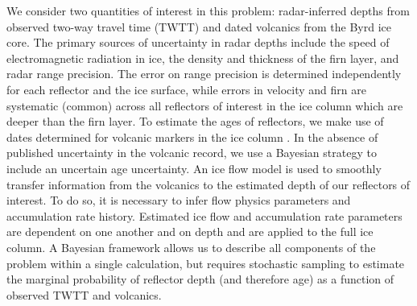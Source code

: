 
We consider two quantities of interest in this problem: radar-inferred depths from observed two-way travel time (TWTT) and dated volcanics from the Byrd ice core. The primary sources of uncertainty in radar depths include the speed of electromagnetic radiation in ice, the density and thickness of the firn layer, and radar range precision. The error on range precision is determined independently for each reflector and the ice surface, while errors in velocity and firn are systematic (common) across all reflectors of interest in the ice column which are deeper than the firn layer. To estimate the ages of reflectors, we make use of dates determined for volcanic markers in the ice column \citep{hammer1997}. %
In the absence of published uncertainty in the volcanic record, we use a Bayesian strategy to include an uncertain age uncertainty.
An ice flow model is used to smoothly transfer information from the volcanics to the estimated depth of our reflectors of interest. To do so, it is necessary to infer flow physics parameters and accumulation rate history. Estimated ice flow and accumulation rate parameters are dependent on one another and on depth and are applied to the full ice column. A Bayesian framework allows us to describe all  components of the problem within a single calculation, but requires stochastic sampling to estimate the marginal probability of reflector depth (and therefore age) as a function of observed TWTT and volcanics.







